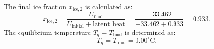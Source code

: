 The final ice fraction \( x_{\text{ice},2} \) is calculated as:  
\[
x_{\text{ice},2} = \frac{U_{\text{final}}}{U_{\text{initial}} + \text{latent heat}} = \frac{-33.462}{-33.462 + 0.933} = 0.933.
\]  
The equilibrium temperature \( T_g = T_{\text{final}} \) is determined as:  
\[
T_g = T_{\text{final}} = 0.00^\circ \text{C}.
\]